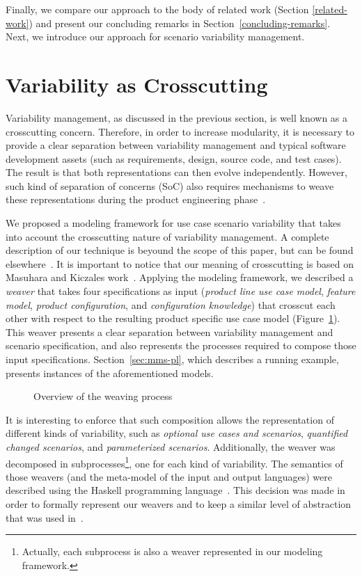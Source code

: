 \documentclass{acm_proc_article-sp}
\begin{document}
Finally, we compare our approach to the body of related work (Section \ref{related-work}) and present our concluding remarks in 
Section~\ref{concluding-remarks}. Next, we introduce our approach for scenario variability management.
   
\section{Variability as Crosscutting}
\label{scenario-variability}

Variability management, as discussed in the previous section, is well known as a crosscutting concern. Therefore, in order to increase modularity, it is necessary to provide a clear separation between 
variability management and typical software development assets (such as requirements, design, source code, and test cases). The result is that both representations can then evolve independently. However, such kind of separation of concerns (SoC) also requires mechanisms to weave these representations during the product engineering phase~\cite{northrop-spl-book}.

We proposed a modeling framework for use case scenario variability that takes into account the crosscutting nature of variability management. A complete description of our technique is beyound the scope of this paper, but can be found elsewhere~\cite{}. It is important to notice that our meaning of crosscutting is based on Masuhara and Kiczales work~\cite{masuhara-ecoop-2003}. Applying the modeling framework, we described a \emph{weaver} that takes four specifications as input (\emph{product line use case model}, \emph{feature model}, \emph{product configuration}, and \emph{configuration knowledge}) that crosscut each other with respect to the resulting product specific use case model (Figure~\ref{fig:wp}). This weaver presents a clear separation between variability management and scenario specification, and also represents the processes required to compose those input specifications. Section~\ref{sec:mms-pl}, which describes a running example, presents instances of the aforementioned models.

\begin{figure}[h]
\centering
{}
\caption{Overview of the weaving process}
\label{fig:wp}
\end{figure}

It is interesting to enforce that such composition allows the representation of different kinds of variability, such as \emph{optional use cases and scenarios}, \emph{quantified changed scenarios}, and 
\emph{parameterized scenarios}. Additionally, the weaver was decomposed in subprocesses\footnote{Actually, each subprocess is also a weaver represented in our modeling framework.}, one for each kind of variability. The semantics of those weavers (and the meta-model of the input and output languages) were described using the Haskell programming language~\cite{haskell-report}. This decision was made in order to formally represent our weavers and to keep a similar level of abstraction that was used in~\cite{masuhara-ecoop-2003}.
\end{document}
